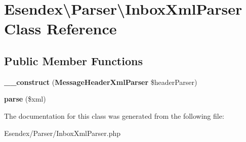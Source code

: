 \section{Esendex\textbackslash{}Parser\textbackslash{}Inbox\-Xml\-Parser Class Reference}
\label{class_esendex_1_1_parser_1_1_inbox_xml_parser}
\subsection*{Public Member Functions}
\begin{DoxyCompactItemize}
\item 
{\bfseries \-\_\-\-\_\-construct} ({\bf Message\-Header\-Xml\-Parser} \$header\-Parser)\label{class_esendex_1_1_parser_1_1_inbox_xml_parser_ad94232866343db3296b0c921a189deb2}

\item 
{\bfseries parse} (\$xml)\label{class_esendex_1_1_parser_1_1_inbox_xml_parser_a67f84bd4a865d479aa873fd9911b2a15}

\end{DoxyCompactItemize}


The documentation for this class was generated from the following file\-:\begin{DoxyCompactItemize}
\item 
Esendex/\-Parser/Inbox\-Xml\-Parser.\-php\end{DoxyCompactItemize}
